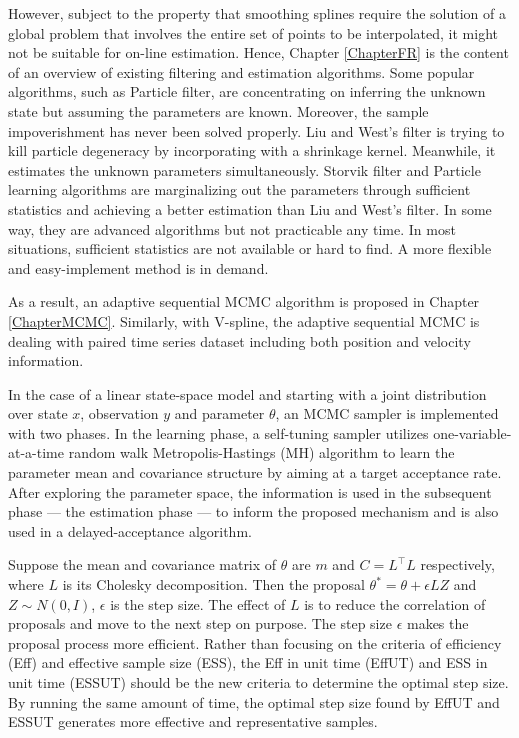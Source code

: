 However, subject to the property that smoothing splines require the solution of a global problem that involves the entire set of points to be interpolated, it might not be suitable for on-line estimation. Hence, Chapter \ref{ChapterFR} is the content of an overview of existing filtering and estimation algorithms. Some popular algorithms, such as Particle filter, are concentrating on inferring the unknown state but assuming the parameters are known. Moreover, the sample impoverishment has never been solved properly. Liu and West's filter is trying to kill particle degeneracy by incorporating with a shrinkage kernel. Meanwhile, it estimates the unknown parameters simultaneously. Storvik filter and Particle learning algorithms are marginalizing out the parameters through sufficient statistics and achieving a better estimation than Liu and West's filter. In some way, they are advanced algorithms but not practicable any time. In most situations, sufficient statistics are not available or hard to find. A more flexible and easy-implement method is in demand. 
 
As a result, an adaptive sequential MCMC algorithm is proposed in Chapter \ref{ChapterMCMC}. Similarly, with V-spline, the adaptive sequential MCMC is dealing with paired time series dataset including both position and velocity information. 

In the case of a linear state-space model and starting with a joint distribution over state $x$, observation $y$ and parameter $\theta$, an MCMC sampler is implemented with two phases. In the learning phase, a self-tuning sampler utilizes one-variable-at-a-time random walk Metropolis-Hastings (MH) algorithm to learn the parameter mean and covariance structure by aiming at a target acceptance rate. After exploring the parameter space, the information is used in the subsequent phase --- the estimation phase --- to inform the proposed mechanism and is also used in a delayed-acceptance algorithm. 

Suppose the mean and covariance matrix of $\theta$ are $m$ and $C=L^\top L$ respectively, where $L$ is its Cholesky decomposition. Then the proposal $\theta^*=\theta + \epsilon LZ$ and $Z\sim N(0,I)$, $\epsilon$ is the step size. The effect of $L$ is to reduce the correlation of proposals and move to the next step on purpose. The step size $\epsilon$ makes the proposal process more efficient. Rather than focusing on the criteria of efficiency (Eff) and effective sample size (ESS), the Eff in unit time (EffUT) and ESS in unit time (ESSUT) should be the new criteria to determine the optimal step size. By running the same amount of time, the optimal step size found by EffUT and ESSUT generates more effective and representative samples. 

